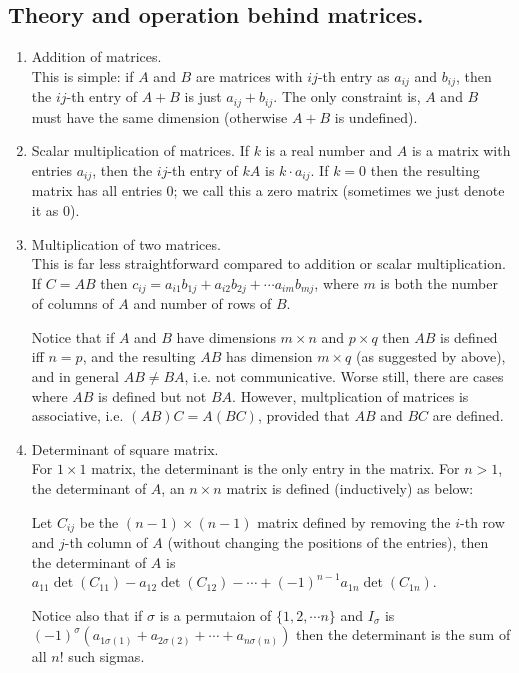 \documentclass[11pt,a4paper]{article}
\begin{document}
\subsection{Theory and operation behind matrices.}
\begin{enumerate}
\item Addition of matrices.\\
This is simple: if $A$ and $B$ are matrices with $ij$-th entry as $a_{ij}$ and $b_{ij}$, then the $ij$-th entry of $A+B$ is just $a_{ij}+b_{ij}$. The only constraint is, $A$ and $B$ must have the same dimension (otherwise $A+B$ is undefined).

\item Scalar multiplication of matrices.
If $k$ is a real number and $A$ is a matrix with entries $a_{ij}$, then the $ij$-th entry of $kA$ is $k\cdot a_{ij}$. If $k=0$ then the resulting matrix has all entries 0; we call this a zero matrix (sometimes we just denote it as 0).

\item Multiplication of two matrices.\\
This is far less straightforward compared to addition or scalar multiplication. If $C=AB$ then $c_{ij}=a_{i1}b_{1j}+a_{i2}b_{2j}+\cdots a_{im}b_{mj}$, where $m$ is both the number of columns of $A$ and number of rows of $B$.

Notice that if $A$ and $B$ have dimensions $m\times n$ and $p\times q$ then $AB$ is defined iff $n=p$, and the resulting $AB$ has dimension $m\times q$ (as suggested by above), and in general $AB\neq BA$, i.e. not communicative. Worse still, there are cases where $AB$ is defined but not $BA$. However, multplication of matrices is associative, i.e. $(AB)C=A(BC)$, provided that $AB$ and $BC$ are defined.

\item Determinant of square matrix.\\
For $1\times 1$ matrix, the determinant is the only entry in the matrix. For $n>1$, the determinant of $A$, an $n\times n$ matrix is defined (inductively) as below:

Let $C_{ij}$ be the $(n-1)\times (n-1)$ matrix defined by removing the $i$-th row and $j$-th column of $A$ (without changing the positions of the entries), then the determinant of $A$ is $a_{11}\det (C_{11})-a_{12}\det (C_{12})-\cdots +(-1)^{n-1}a_{1n}\det (C_{1n})$. 

Notice also that if $\sigma$ is a permutaion of $\{1,2,\cdots n\}$ and $I_{\sigma}$ is $(-1)^{\sigma} (a_{1\sigma (1)}+a_{2\sigma(2)}+\cdots +a_{n\sigma(n)})$ then the determinant is the sum of all $n!$ such sigmas.


\end{enumerate}
\end{document}
